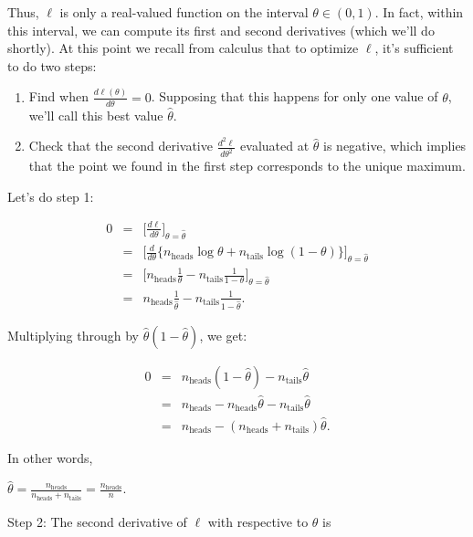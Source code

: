 \documentclass[6008notes.tex]{subfiles}
\begin{document}
Thus, $\ell$ is only a real-valued function on the interval $\theta \in (0,1)$. In fact, within this interval, we can compute its first and second derivatives (which we'll do shortly). At this point we recall from calculus that to optimize $\ell$, it's sufficient to do two steps:

\begin{enumerate}
\item Find when $\frac{d\ell (\theta )}{d\theta }=0$. Supposing that this happens for only one value of $\theta$, we'll call this best value $\widehat{\theta }$.

\item Check that the second derivative $\frac{d^{2}\ell }{d\theta ^{2}}$ evaluated at $\widehat{\theta }$ is negative, which implies that the point we found in the first step corresponds to the unique maximum.
\end{enumerate}

Let's do step 1:

\begin{eqnarray*}
0&=&\Big[\frac{d\ell}{d\theta}\Big]_{\theta=\widehat{\theta}}\\
 &=&\bigg[\frac{d}{d\theta}\big\{ n_{\text{heads}}\log\theta+n_{\text{tails}}\log(1-\theta)\big\}\bigg]_{\theta=\widehat{\theta}}\\
&=&\bigg[n_{\text{heads}}\frac{1}{\theta}-n_{\text{tails}}\frac{1}{1-\theta}\bigg]_{\theta=\widehat{\theta}}\\
&=&n_{\text{heads}}\frac{1}{\widehat{\theta}}-n_{\text{tails}}\frac{1}{1-\widehat{\theta}}.
\end{eqnarray*}

Multiplying through by $\widehat{\theta }(1-\widehat{\theta })$, we get:

\begin{eqnarray*}
0
&=& n_{\text{heads}}(1-\widehat{\theta})-n_{\text{tails}}\widehat{\theta} \\
&=& n_{\text{heads}}-n_{\text{heads}}\widehat{\theta}-n_{\text{tails}}\widehat{\theta} \\
&=& n_{\text{heads}}-(n_{\text{heads}}+n_{\text{tails}})\widehat{\theta}.
\end{eqnarray*}

In other words,

{\centering$\widehat{\theta }=\frac{n_{\text {heads}}}{n_{\text {heads}}+n_{\text {tails}}}=\frac{n_{\text {heads}}}{n}. $ \par}
 
Step 2: The second derivative of $\ell$ with respective to $\theta$ is
\end{document}
